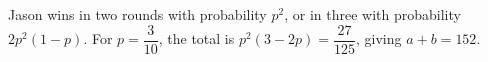 Jason wins in two rounds with probability $p^2$, or in three with probability $2p^2(1-p)$. For $p=\dfrac{3}{10}$, the total is $p^2(3-2p)=\dfrac{27}{125}$, giving $a+b=\boxed{152}$.
